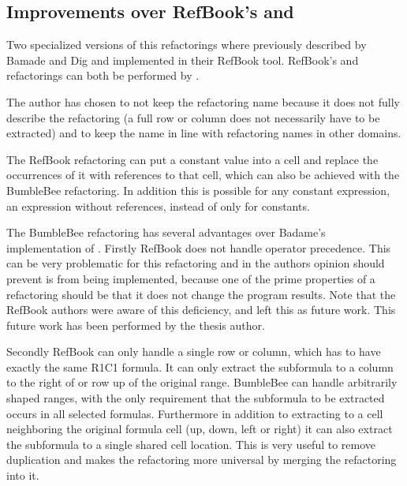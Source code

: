 \subsection{Improvements over RefBook's  and }
\label{subsubsec:improvementsextractformula}

Two specialized versions of this refactorings where previously described by Bamade and Dig \cite{badame2012refactoring} and implemented in their RefBook tool.
RefBook's  and  refactorings can both be performed by .

The author has chosen to not keep the  refactoring name because it does not fully describe the refactoring (a full row or column does not necessarily have to be extracted) and to keep the name in line with refactoring names in other domains.

The RefBook  refactoring can put a constant value into a cell and replace the occurrences of it with references to that cell, which can also be achieved with the BumbleBee  refactoring.
In addition this is possible for any constant expression, an expression without references, instead of only for constants.

The BumbleBee  refactoring has several advantages over Badame's implementation of .
Firstly RefBook does not handle operator precedence.
This can be very problematic for this refactoring and in the authors opinion should prevent is from being implemented, because one of the prime properties of a refactoring should be that it does not change the program results.
Note that the RefBook authors were aware of this deficiency, and left this as future work.
This future work has been performed by the thesis author.

Secondly RefBook can only handle a single row or column, which has to have exactly the same R1C1 formula. It can only extract the subformula to a column to the right of or row up of the original range.
BumbleBee can handle arbitrarily shaped ranges, with the only requirement that the subformula to be extracted occurs in all selected formulas.
Furthermore in addition to extracting to a cell neighboring the original formula cell (up, down, left or right) it can also extract the subformula to a single shared cell location.
This is very useful to remove duplication and makes the refactoring more universal by merging the  refactoring into it.

